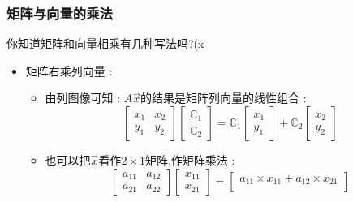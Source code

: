 \documentclass[UTF8,12pt]{ctexbook}
\newcommand{\mathConstant}{\mathbb{C}}
\begin{document}
{{{{  \subsubsection{矩阵与向量的乘法}{
    你知道矩阵和向量相乘有几种写法吗?(x
    \begin{itemize}
      \item {
            矩阵右乘列向量 :
            \begin{itemize}
              \item {
                    由列图像可知 : $A\vec{x}$的结果是矩阵列向量的线性组合 :
                    $$
                      \begin{bmatrix}
                        x_1 & x_2 \\
                        y_1 & y_2
                      \end{bmatrix}
                      \begin{bmatrix}
                        \mathConstant_1 \\
                        \mathConstant_2
                      \end{bmatrix}
                      =
                      \mathConstant_1\begin{bmatrix}
                        x_1 \\
                        y_1
                      \end{bmatrix}
                      +
                      \mathConstant_2\begin{bmatrix}
                        x_2 \\
                        y_2
                      \end{bmatrix}
                    $$
                    }
              \item {
                    也可以把$\vec{x}$看作$2 \times 1$矩阵,作矩阵乘法 :
                    $$
                      \begin{bmatrix}
                        a_{11} & a_{12} \\
                        a_{21} & a_{22}
                      \end{bmatrix}
                      \begin{bmatrix}
                        x_{11} \\
                        x_{21}
                      \end{bmatrix}
                      =
                      \begin{bmatrix}
                        a_{11} \times x_{11} + a_{12} \times x_{21} \\

\end{bmatrix}$$}
\end{itemize}}
\end{itemize}}}}}}
\end{document}
